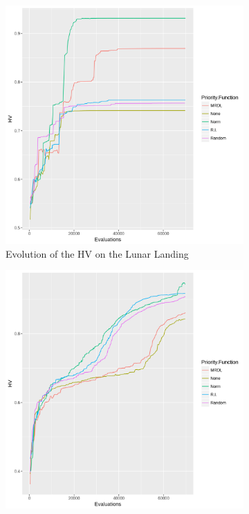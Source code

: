 \begin{figure}[!t]
	\begin{subfigure}[b]{0.33\textwidth}
		\centering
		\includegraphics[width=1\textwidth, height=1\textwidth]{images/moonhv_all}
		\caption{Evolution of the HV on the Lunar Landing}
	\end{subfigure}
	\begin{subfigure}[b]{0.33\textwidth}
		\centering
		\includegraphics[width=1\textwidth, height=1\textwidth]{images/UF3hv_all}

\end{subfigure}
\end{figure}
